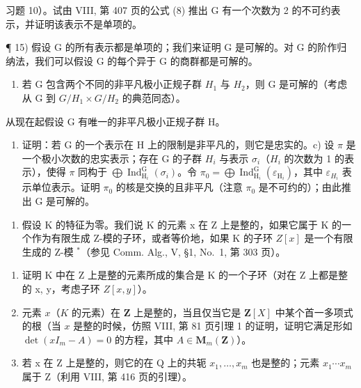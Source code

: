 习题 10）。试由 VIII, 第 407 页的公式 (8) 推出 G 有一个次数为 2 的不可约表示，并证明该表示不是单项的。

¶ 15) 假设 G 的所有表示都是单项的；我们来证明 G 是可解的。对 G 的阶作归纳法，我们可以假设 G 的每个异于 G 的商群都是可解的。

\begin{enumerate}
\def\labelenumi{\alph{enumi})}
\tightlist
\item
  若 G 包含两个不同的非平凡极小正规子群 \(H_{1}\) 与 \(H_{2}\)，则 G 是可解的（考虑从 G 到 \(G/H_{1} \times G/H_{2}\) 的典范同态）。
\end{enumerate}

从现在起假设 G 有唯一的非平凡极小正规子群 H。

\begin{enumerate}
\def\labelenumi{\alph{enumi})}
\setcounter{enumi}{1}
\tightlist
\item
  证明：若 G 的一个表示在 H 上的限制是非平凡的，则它是忠实的。c) 设 \(\pi\) 是一个极小次数的忠实表示；存在 G 的子群 \(H_{i}\) 与表示 \(\sigma_{i}\)（\(H_{i}\) 的次数为 1 的表示），使得 \(\pi\) 同构于 \(\bigoplus\operatorname{Ind}_{\operatorname{H}_{i}}^{\operatorname{G}}(\sigma_{i})\)。令 \(\pi_{0}=\bigoplus\operatorname{Ind}_{\operatorname{H}_{i}}^{\operatorname{G}}(\varepsilon_{\operatorname{H}_{i}})\)，其中 \(\varepsilon_{H_{i}}\) 表示单位表示。证明 \(\pi_{0}\) 的核是交换的且非平凡（注意 \(\pi_{0}\) 是不可约的）；由此推出 G 是可解的。
\end{enumerate}

\begin{enumerate}
\def\labelenumi{\arabic{enumi})}
\setcounter{enumi}{15}
\tightlist
\item
  假设 K 的特征为零。我们说 K 的元素 x 在 Z 上是整的，如果它属于 K 的一个作为有限生成 Z-模的子环，或者等价地，如果 K 的子环 \(Z[x]\) 是一个有限生成的 Z-模 \(^{*}\)（参见 Comm. Alg., V, §1, No.~1, 第 303 页）。
\end{enumerate}

\begin{enumerate}
\def\labelenumi{\alph{enumi})}
\item
  证明 K 中在 Z 上是整的元素所成的集合是 K 的一个子环（对在 Z 上都是整的 x, y，考虑子环 \(Z[x, y]\)）。
\item
  元素 \(x\)（\(K\) 的元素）在 \(\mathbf{Z}\) 上是整的，当且仅当它是 \(\mathbf{Z}[X]\) 中某个首一多项式的根（当 \(x\) 是整的时候，仿照 VIII, 第 81 页引理 1 的证明，证明它满足形如 \(\det(xI_m - A) = 0\) 的方程，其中 \(A \in \mathbf{M}_m(\mathbf{Z})\)）。
\item
  若 x 在 Z 上是整的，则它的在 Q 上的共轭 \(x_{1},\ldots,x_{m}\) 也是整的；元素 \(x_{1}\cdots x_{m}\) 属于 Z（利用 VIII, 第 416 页的引理）。
\end{enumerate}

